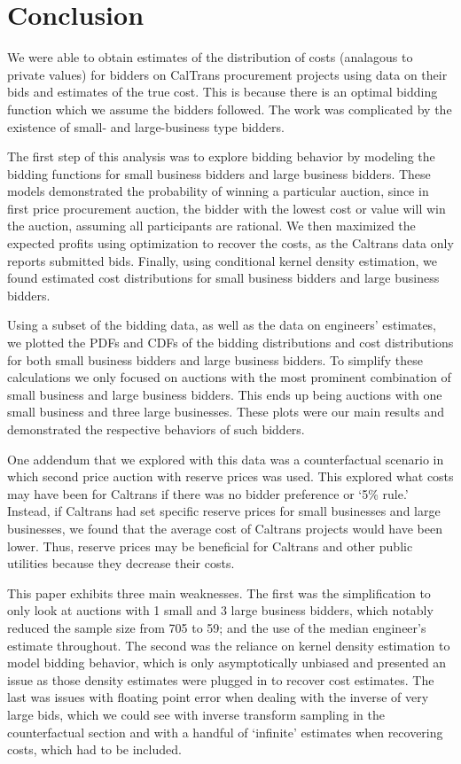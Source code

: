 \section{Conclusion}

We were able to obtain estimates of the distribution of costs (analagous to private values)
for bidders on CalTrans procurement projects using data on their bids and estimates of
the true cost. This is because there is an optimal bidding function which we
assume the bidders followed. The work was complicated by the existence of
small- and large-business type bidders.

The first step of this analysis was to explore bidding behavior by modeling the
bidding functions for small business bidders and large business bidders.
These models demonstrated the probability of winning a particular auction,
since in first price procurement auction, the bidder with the lowest cost or value
will win the auction, assuming all participants are rational.
We then maximized the expected profits using optimization to recover the costs,
as the Caltrans data only reports submitted bids.
Finally, using conditional kernel density estimation, we found estimated
cost distributions for small business bidders and large business bidders.

Using a subset of the bidding data, as well as the data on
engineers' estimates, we plotted the PDFs and CDFs of the bidding distributions
and cost distributions for both small business bidders and large business bidders.
To simplify these calculations we only focused on auctions with the most prominent combination of small business and large business bidders.
This ends up being auctions with one small business and three large businesses.
These plots were our main results and demonstrated the respective behaviors of such bidders.

One addendum that we explored with this data was a counterfactual scenario in which
second price auction with reserve prices was used. This explored what costs may have
been for Caltrans if there was no bidder preference or `5\% rule.' Instead,
if Caltrans had set specific reserve prices for small businesses and large businesses,
we found that the average cost of Caltrans projects would have been lower.
Thus, reserve prices may be beneficial for Caltrans and other public utilities because they decrease their costs. 

This paper exhibits three main weaknesses. The first was the simplification to only look at
auctions with 1 small and 3 large business bidders, which notably reduced
the sample size from 705 to 59; and the use of the median
engineer's estimate throughout. The second was the reliance on kernel density estimation
to model bidding behavior, which is only asymptotically unbiased and presented
an issue as those density estimates were plugged in to recover cost estimates.
The last was issues with floating point error when dealing with the inverse
of very large bids, which we could see with inverse transform sampling
in the counterfactual section and with a handful of `infinite' estimates when
recovering costs, which had to be included.

